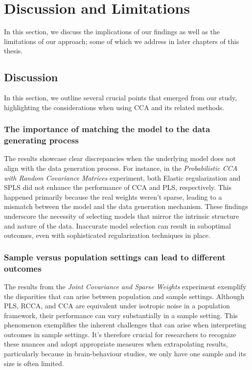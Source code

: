 \section{Discussion and Limitations}

In this section, we discuss the implications of our findings as well as the limitations of our approach; some of which we address in later chapters of this thesis.

\subsection{Discussion}

In this section, we outline several crucial points that emerged from our study, highlighting the considerations when using CCA and its related methods.

\subsubsection{The importance of matching the model to the data generating process}

The results showcase clear discrepancies when the underlying model does not align with the data generation process. For instance, in the \textit{Probabilistic CCA with Random Covariance Matrices} experiment, both Elastic regularization and SPLS did not enhance the performance of CCA and PLS, respectively.
This happened primarily because the real weights weren't sparse, leading to a mismatch between the model and the data generation mechanism.
These findings underscore the necessity of selecting models that mirror the intrinsic structure and nature of the data.
Inaccurate model selection can result in suboptimal outcomes, even with sophisticated regularization techniques in place.

\subsubsection{Sample versus population settings can lead to different outcomes}

The results from the \textit{Joint Covariance and Sparse Weights} experiment exemplify the disparities that can arise between population and sample settings.
Although PLS, RCCA, and CCA are equivalent under isotropic noise in a population framework, their performance can vary substantially in a sample setting.
This phenomenon exemplifies the inherent challenges that can arise when interpreting outcomes in sample settings.
It's therefore crucial for researchers to recognize these nuances and adopt appropriate measures when extrapolating results, particularly because in brain-behaviour studies, we only have one sample and its size is often limited.

